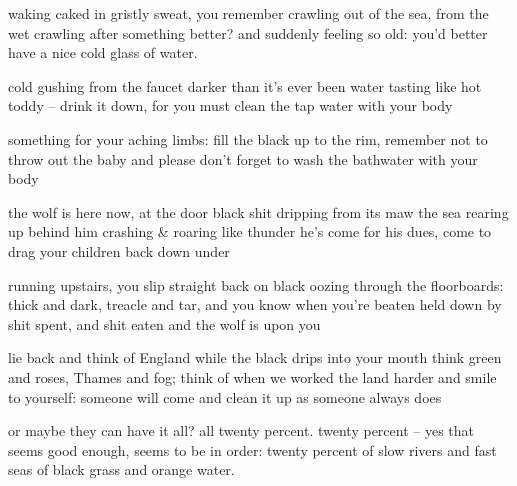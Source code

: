 \documentclass{article}
\begin{document}

\begin{poem}

  \begin{stanza}
    waking caked in gristly sweat, you remember \verseline
    crawling out of the sea, from the wet \verseline
    crawling after something better? \verseline
    and suddenly feeling so old: \verseline
    you'd better have a nice cold \verseline
    glass of water.
  \end{stanza}

  \begin{stanza}
    cold gushing from the faucet \verseline
    darker than it's ever been \verseline
    water tasting like hot toddy -- \verseline
    drink it down, for you must clean \verseline
    the tap water with your body
  \end{stanza}

  \begin{stanza}
    something for your aching limbs: \verseline
    fill the black up to the rim, \verseline
    remember not to throw out the baby \verseline
    and please don't forget to wash \verseline
    the bathwater with your body
  \end{stanza}

  \begin{stanza}
    the wolf is here now, at the door \verseline
    black shit dripping from its maw \verseline
    the sea rearing up behind him \verseline
    crashing \& roaring like thunder \verseline
    he's come for his dues, come to drag \verseline
    your children back down under
  \end{stanza}

  \begin{stanza}
    running upstairs, you slip straight back \verseline
    on black oozing through the floorboards: \verseline
    thick and dark, treacle and tar, \verseline
    and you know when you're beaten \verseline
    held down by shit spent, and shit eaten \verseline
    and the wolf is upon you
  \end{stanza}

  \begin{stanza}
    lie back and think of England \verseline
    while the black drips into your mouth \verseline
    think green and roses, Thames and fog; \verseline
    think of when we worked the land harder \verseline
    and smile to yourself: \verseline
    someone will come and clean it up \verseline
    as someone always does
  \end{stanza}

  \begin{stanza}
    or maybe they can have it all? all twenty percent. \verseline
    twenty percent -- yes that seems \verseline
    good enough, seems to be in order: \verseline
    twenty percent of slow rivers and fast seas \verseline
    of black grass and orange water.
  \end{stanza}

\end{poem}
\end{document}
